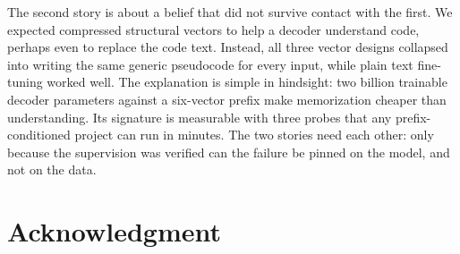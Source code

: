 \documentclass[conference]{IEEEtran}
\begin{document}
The second story is about a belief that did not survive contact with the first. We expected compressed structural vectors to help a decoder understand code, perhaps even to replace the code text. Instead, all three vector designs collapsed into writing the same generic pseudocode for every input, while plain text fine-tuning worked well. The explanation is simple in hindsight: two billion trainable decoder parameters against a six-vector prefix make memorization cheaper than understanding. Its signature is measurable with three probes that any prefix-conditioned project can run in minutes. The two stories need each other: only because the supervision was verified can the failure be pinned on the model, and not on the data.

\section*{Acknowledgment}

% 
% 
\end{document}
